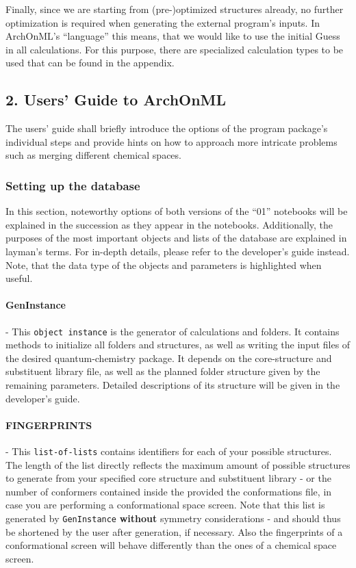 \documentclass[12pt]{achemso}
\begin{document}
\noindent Finally, since we are starting from (pre-)optimized structures already, no further optimization is required when generating the external program's inputs. In ArchOnML's ``language'' this means, that we would like to use the initial Guess in all calculations. For this purpose, there are specialized calculation types to be used that can be found in the appendix.

\newpage

\subsection{2. Users' Guide to ArchOnML}

\noindent The users' guide shall briefly introduce the options of the program package's individual steps and provide hints on how to approach more intricate problems such as merging different chemical spaces.

\subsubsection{Setting up the database}

\noindent In this section, noteworthy options of both versions of the ``01'' notebooks will be explained in the succession as they appear in the notebooks. Additionally, the purposes of the most important objects and lists of the database are explained in layman's terms. For in-depth details, please refer to the developer's guide instead. Note, that the data type of the objects and parameters is highlighted when useful.

\paragraph{GenInstance} - This \texttt{object instance} is the generator of calculations and folders. It contains methods to initialize all folders and structures, as well as writing the input files of the desired quantum-chemistry package. It depends on the core-structure and substituent library file, as well as the planned folder structure given by the remaining parameters. Detailed descriptions of its structure will be given in the developer's guide.

\paragraph{FINGERPRINTS} - This \texttt{list-of-lists} contains identifiers for each of your possible structures. The length of the list directly reflects the maximum amount of possible structures to generate from your specified core structure and substituent library - or the number of conformers contained inside the provided the conformations file, in case you are performing a conformational space screen. Note that this list is generated by \texttt{GenInstance} \textbf{without} symmetry considerations - and should thus be shortened by the user after generation, if necessary. Also the fingerprints of a conformational screen will behave differently than the ones of a chemical space screen.
\end{document}
